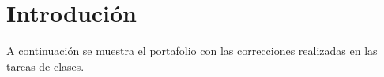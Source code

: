 \documentclass{article}
\begin{document}

\section{Introdución}

A continuación se muestra el portafolio con las correcciones realizadas en las tareas de clases.
















\end{document}
